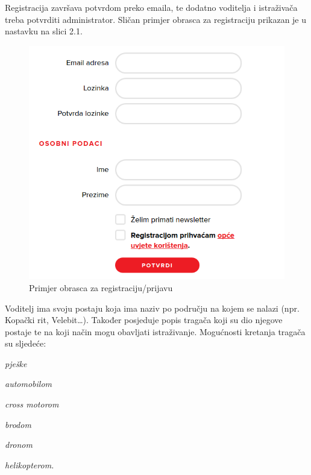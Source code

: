 		Registracija završava potvrdom preko emaila, te dodatno voditelja i istraživača treba potvrditi administrator. Sličan primjer obrasca za registraciju prikazan je u nastavku na slici 2.1.
		
		\begin{figure}[H]
			\includegraphics[scale=0.75]{slike/probrazac.PNG} %
			\centering
			\caption{Primjer obrasca za registraciju/prijavu}
			\label{fig:probrasca} %
		\end{figure}
		
		
		
		Voditelj ima svoju postaju koja ima naziv po području na kojem se nalazi (npr. Kopački rit, Velebit…). Također posjeduje popis tragača koji su dio njegove postaje te na koji način mogu obavljati istraživanje. Mogućnosti kretanja tragača su sljedeće:
		\begin{packed_item}
			\item \textit{pješke}
			\item \textit{automobilom}
			\item \textit{cross motorom}
			\item \textit{brodom}
			\item \textit{dronom}
			\item \textit{helikopterom.}
		\end{packed_item}
		
